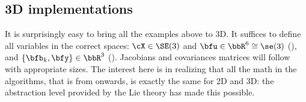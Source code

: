 \subsection{3D implementations}
\label{sec:demos_3D}

It is surprisingly easy to bring all the examples above to 3D. 
It suffices to define all variables in the correct spaces:
$\cX\in\SE(3)$ and $\bfu\in\bbR^6\cong\se(3)$ (), and $\{\bfb_k,\bfy\}\in\bbR^3$ ().
Jacobians and covariances matrices will follow with appropriate sizes.
%
The interest here is in realizing that all the math in the algorithms, that is from  onwards, is exactly the same for 2D and 3D: the abstraction level provided by the Lie theory has made this possible.
